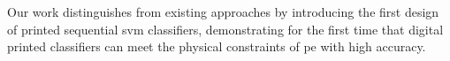 Our work distinguishes from existing approaches by introducing the first design of printed sequential \gls{svm} classifiers, demonstrating for the first time that digital printed classifiers can meet the physical constraints of \gls{pe} with high accuracy.






